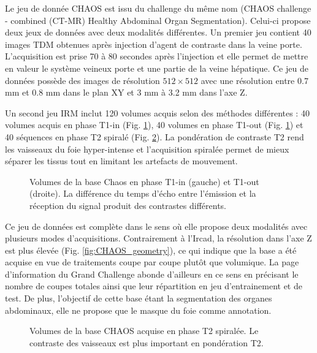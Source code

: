 Le jeu de donnée CHAOS est issu du challenge du même nom (CHAOS challenge - combined (CT-MR) Healthy Abdominal Organ Segmentation). Celui-ci propose deux jeux de données avec deux modalités différentes. Un premier jeu contient 40 images TDM obtenues après injection d'agent de contraste dans la veine porte. L'acquisition est prise 70 à 80 secondes après l'injection et elle permet de mettre en valeur le système veineux porte et une partie de la veine hépatique. Ce jeu de données possède des images de résolution $512\times 512$ avec une résolution entre 0.7 mm et 0.8 mm dans le plan XY et 3 mm à 3.2 mm dans l'axe Z.

Un second jeu IRM inclut 120 volumes acquis selon des méthodes différentes : 40 volumes acquis en phase T1-in (Fig. \ref{fig:T1_MRI_2}), 40 volumes  en phase T1-out (Fig. \ref{fig:T1_MRI_2}) et 40 séquences en phase T2 spiralé (Fig. \ref{fig:T2_MRI}). La pondération de contraste T2 rend les vaisseaux du foie hyper-intense et l'acquisition spiralée permet de mieux séparer les tissus tout en limitant les artefacts de mouvement.

\begin{figure}
    \centering
    \caption{Volumes de la base Chaos en phase T1-in (gauche) et T1-out (droite). La différence du temps d'écho entre l'émission et la réception du signal produit des contrastes différents.}
    \label{fig:T1_MRI_2}
\end{figure}

Ce jeu de données est complète dans le sens où elle propose deux modalités avec plusieurs modes d'acquisitions. Contrairement à l'Ircad, la résolution dans l'axe Z est plus élevée (Fig. \ref{fig:CHAOS_geometry}), ce qui indique que la base a été acquise en vue de traitements coupe par coupe plutôt que volumique. La page d'information du Grand Challenge abonde d'ailleurs en ce sens en précisant le nombre de coupes totales ainsi que leur répartition en jeu d'entrainement et de test. De plus, l'objectif de cette base étant la segmentation des organes abdominaux, elle ne propose que le masque du foie comme annotation.

\begin{figure}
    \centering
    \caption{Volumes de la base CHAOS acquise en phase T2 spiralée. Le contraste des vaisseaux est plus important en pondération T2.}
    \label{fig:T2_MRI}
\end{figure}

